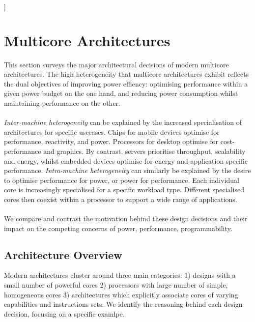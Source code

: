 ]
\section{Multicore Architectures}
\paragraph{}  This section surveys the major architectural decisions of modern multicore 
architectures. The high heterogeneity that multicore architectures exhibit
reflects the dual objectives of improving power effiency:
optimising performance within a given power budget on the one hand, 
and reducing power consumption whilst maintaining performance on the other.



\paragraph{} \emph{Inter-machine heterogeneity} can be explained by the
increased specialisation of  architectures for specific usecases. Chips for
mobile devices optimise for performance, reactivity, and power.
Processors for desktop optimise for cost-performance and graphics.
By contrast, servers prioritise throughput, scalability and energy,
whilst embedded devices optimise for energy and application-specific
performance. \emph {Intra-machine heterogeneity} can 
similarly be explained by the desire to optimise performance for power, or power
for performance. Each individual core is increasingly specialised
for a specific workload type. Different specialised cores then coexist within
a processor to support a wide range of applications. 

\paragraph{} We compare and contrast the motivation behind these
design decisions and their impact on the competing
concerns of power, performance, programmability.


\subsection{Architecture Overview}


Modern architectures cluster around three main categories:
1) designs with a small number of powerful cores 2) processors with large number of
simple, homogeneous cores 3) architectures which explicitly associate
cores of varying capabilities and instructions sets. We identify the
reasoning behind each design decision, focusing on a specific examlpe. 


